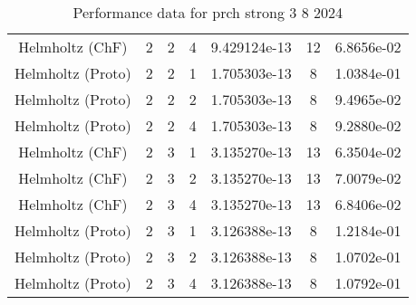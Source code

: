 \documentclass{article}
\begin{document}
\begin{small}
\begin{table}
\begin{center}
\begin{tabular}{|c|c|c|c|c|c||c|}
      Helmholtz       (ChF) & 2 & 2 & 4& 9.429124e-13 & 12 & 6.8656e-02\\
      Helmholtz     (Proto) & 2 & 2 & 1& 1.705303e-13 & 8 & 1.0384e-01\\
      Helmholtz     (Proto) & 2 & 2 & 2& 1.705303e-13 & 8 & 9.4965e-02\\
      Helmholtz     (Proto) & 2 & 2 & 4& 1.705303e-13 & 8 & 9.2880e-02\\
      \hline 
      Helmholtz       (ChF) & 2 & 3 & 1& 3.135270e-13 & 13 & 6.3504e-02\\
      Helmholtz       (ChF) & 2 & 3 & 2& 3.135270e-13 & 13 & 7.0079e-02\\
      Helmholtz       (ChF) & 2 & 3 & 4& 3.135270e-13 & 13 & 6.8406e-02\\
      Helmholtz     (Proto) & 2 & 3 & 1& 3.126388e-13 & 8 & 1.2184e-01\\
      Helmholtz     (Proto) & 2 & 3 & 2& 3.126388e-13 & 8 & 1.0702e-01\\
      Helmholtz     (Proto) & 2 & 3 & 4& 3.126388e-13 & 8 & 1.0792e-01\\
      \hline 
    \end{tabular} 
  \end{center}   
  \caption{Performance data for  prch strong 3 8 2024} 
\end{table} 
\end{small} 
\end{document}
